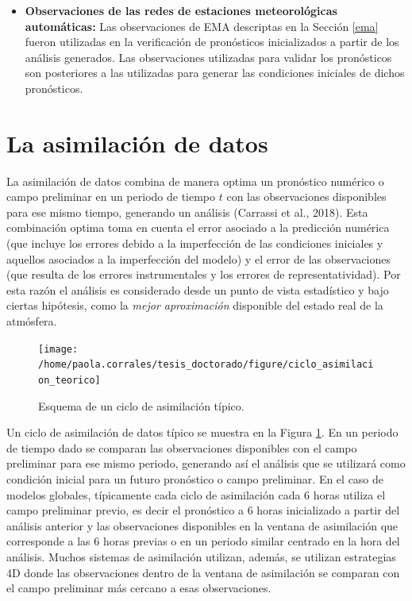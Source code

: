 \documentclass[12pt,oneside,a4paper]{reedthesis}
\begin{document}
\begin{itemize}
\item
  \textbf{Observaciones de las redes de estaciones meteorológicas automáticas:} Las observaciones de EMA descriptas en la Sección \ref{ema} fueron utilizadas en la verificación de pronósticos inicializados a partir de los análisis generados. Las observaciones utilizadas para validar los pronósticos son posteriores a las utilizadas para generar las condiciones iniciales de dichos pronósticos.
\end{itemize}
\hypertarget{la-asimilaciuxf3n-de-datos}{%
\section{La asimilación de datos}\label{la-asimilaciuxf3n-de-datos}}

La asimilación de datos combina de manera optima un pronóstico numérico o campo preliminar en un periodo de tiempo \(t\) con las observaciones disponibles para ese mismo tiempo, generando un análisis (Carrassi et al., 2018). Esta combinación optima toma en cuenta el error asociado a la predicción numérica (que incluye los errores debido a la imperfección de las condiciones iniciales y aquellos asociados a la imperfección del modelo) y el error de las observaciones (que resulta de los errores instrumentales y los errores de representatividad). Por esta razón el análisis es considerado desde un punto de vista estadístico y bajo ciertas hipótesis, como la \emph{mejor aproximación} disponible del estado real de la atmósfera.


\begin{figure}

{\centering \texttt{[image: /home/paola.corrales/tesis\_doctorado/figure/ciclo\_asimilacion\_teorico]} 

}

\caption{Esquema de un ciclo de asimilación típico.}\label{fig:ciclo-asimilacion-teorico}
\end{figure}
Un ciclo de asimilación de datos típico se muestra en la Figura \ref{fig:ciclo-asimilacion-teorico}. En un periodo de tiempo dado se comparan las observaciones disponibles con el campo preliminar para ese mismo periodo, generando así el análisis que se utilizará como condición inicial para un futuro pronóstico o campo preliminar. En el caso de modelos globales, típicamente cada ciclo de asimilación cada 6 horas utiliza el campo preliminar previo, es decir el pronóstico a 6 horas inicializado a partir del análisis anterior y las observaciones disponibles en la ventana de asimilación que corresponde a las 6 horas previas o en un periodo similar centrado en la hora del análisis. Muchos sistemas de asimilación utilizan, además, se utilizan estrategias 4D donde las observaciones dentro de la ventana de asimilación se comparan con el campo preliminar más cercano a esas observaciones.
\end{document}
